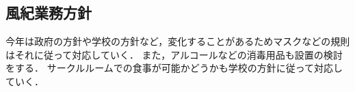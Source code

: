 \subsection*{風紀業務方針}


今年は政府の方針や学校の方針など，変化することがあるためマスクなどの規則はそれに従って対応していく．
また，アルコールなどの消毒用品も設置の検討をする．
サークルルームでの食事が可能かどうかも学校の方針に従って対応していく．
